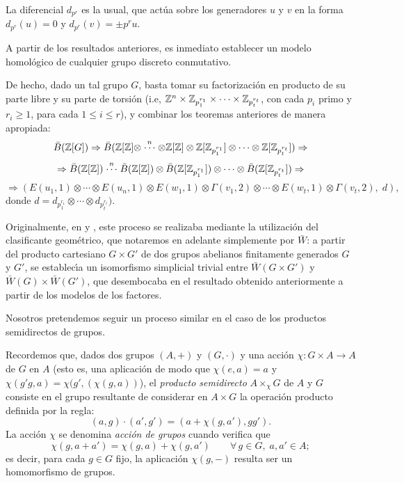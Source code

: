 La diferencial $d_{p^r}$ es la usual, que act\'{u}a sobre los
generadores $u$ y $v$ en la forma $d_{p^r}(u)=0$ y $d_{p^r}(v)=\pm
p^r u$.

A partir de los resultados anteriores, es inmediato establecer un
modelo homol\'{o}gico de cualquier grupo discreto conmutativo.

De hecho, dado un tal grupo $G$, basta tomar su factorizaci\'{o}n en
producto de su parte libre y su parte de torsi\'{o}n (i.e, ${\Bbb Z}^n
\times {\Bbb Z}_{p_1^{r_1}} \times \cdots \times {\Bbb Z}_{p_t^{r_t}}$, con
cada $p_i$ primo y $r_i \geq 1$, para cada $1 \leq i \leq r$), y
combinar los teoremas anteriores de manera apropiada:
$$\bar{B}({\Bbb Z}[G]) \Rightarrow \bar{B}({\Bbb Z}[{\Bbb Z}] \otimes
\stackrel{n}{\cdots} \otimes {\Bbb Z}[{\Bbb Z}] \otimes {\Bbb Z}[{\Bbb Z}_{p_1^{r_1}}]
\otimes \cdots \otimes {\Bbb Z}[{\Bbb Z}_{p_t^{r_t}}]) \Rightarrow$$
$$\Rightarrow \bar{B}({\Bbb Z}[{\Bbb Z}]) \stackrel{n}{\cdots} \bar{B}({\Bbb Z}[{\Bbb Z}])
\otimes \bar{B}({\Bbb Z}[{\Bbb Z}_{p_1^{r_1}}]) \otimes \cdots \otimes
\bar{B}({\Bbb Z}[{\Bbb Z}_{p_t^{r_t}}]) \Rightarrow$$ $$\Rightarrow (E(u_1,1) \otimes
\cdots \otimes E(u_n,1) \otimes E(w_1,1) \otimes \Gamma (v_1,2)
\otimes \cdots \otimes E(w_t,1) \otimes \Gamma (v_t,2), \;d),$$
donde $d=d_{p_1^{r_1}} \otimes \cdots \otimes d_{p_t^{r_t}}).$

Originalmente, en \cite{EM53} y \cite{EM54}, este proceso se
realizaba mediante la utilizaci\'{o}n del clasificante geom\'{e}trico,
que notaremos en adelante simplemente por $\bar{W}$:
a partir del producto cartesiano $G \times G'$ de dos grupos
abelianos finitamente generados $G$ y $G'$, se establec\'{\i}a un
isomorfismo simplicial trivial entre $\bar{W}(G \times G')$ y
$\bar{W}(G) \times \bar{W}(G')$, que desembocaba en el resultado
obtenido anteriormente a partir de los modelos de los factores.

Nosotros pretendemos seguir un proceso similar en el caso de los
productos semidirectos de grupos.

Recordemos que, dados dos grupos $(A,+)$ y $(G,\cdot)$ y una acci\'{o}n
$\chi :G \times A \rightarrow A$ de $G$ en $A$ (esto es, una aplicaci\'{o}n de
modo que $\chi (e,a)=a$ y $\chi (g'g,a)= \chi (g',(\chi (g,a))$), el {\em
producto semidirecto} $A \times _\chi G$ de $A$ y $G$ consiste en el grupo
resultante de considerar en $A \times G$ la operaci\'{o}n producto
definida por la regla: $$(a,g) \cdot (a',g')=(a+ \chi
(g,a'),gg').$$ La acci\'{o}n $\chi$ se denomina {\em acci\'{o}n de grupos}
cuando verifica que $$\chi (g,a+a')= \chi (g,a) + \chi (g,a') \qquad
\forall \, g \in G, \; a,a' \in A;$$ es decir, para cada $g \in G$ fijo,
la aplicaci\'{o}n $\chi (g,-)$ resulta ser un homomorfismo de grupos.

